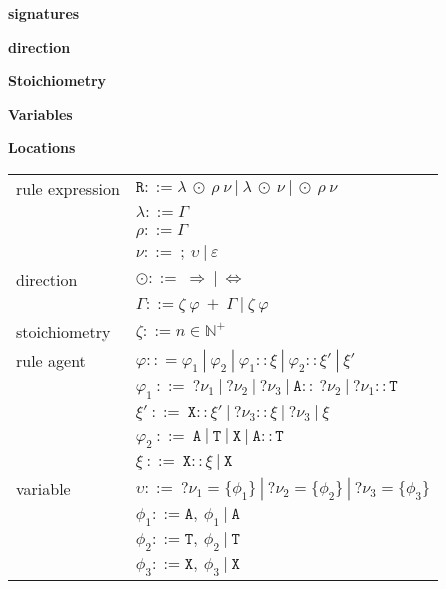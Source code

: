 \documentclass{entcs}
\renewcommand{\~}[0]{\texttildelow}
\begin{document}
\textbf{signatures}

\textbf{direction}

\textbf{Stoichiometry}

\textbf{Variables}

\textbf{Locations}

\begin{center}
{\small
\hspace*{-1cm}\begin{tabular}{ l l }
 rule expression & $\mathtt{R} ::= \lambda ~\odot~ \rho~\nu ~|~ \lambda ~\odot~\nu ~|~ \odot~ \rho~\nu $\\
  & $\lambda ::= \Gamma$\\
  & $\rho ::= \Gamma$\\
  & $\nu ::=~ ;~\upsilon ~|~ \varepsilon$\\
 direction & $\odot ::=~ \Rightarrow~|~\Leftrightarrow $\\
  & $\Gamma ::= \zeta~\varphi~ +~\Gamma ~|~ \zeta~\varphi$\\
 stoichiometry & $\zeta ::= n \in \mathbb{N}^+$\\
 rule agent & $\varphi :: = \varphi_1~|~\varphi_2~|~\varphi_1::\xi~|~\varphi_2::\xi'~|~\xi'$\\
  & $\varphi_1  ~::=~  ?\nu_1~|~?\nu_2~|~?\nu_3~|~\mathtt{A}::~?\nu_2~|~?\nu_1::\mathtt{T}$\\
  & $\xi' ~::=~ \mathtt{X}::\xi'~|~?\nu_3::\xi~|~?\nu_3~|~\xi$\\
  & $\varphi_2  ~::=~  \mathtt{A}~|~\mathtt{T}~|~\mathtt{X}~|~\mathtt{A}::\mathtt{T}$\\
  & $\xi  ~::=~  \mathtt{X}::\xi~|~\mathtt{X}$\\
 variable & $\upsilon ::=~?\nu_1=\{\phi_1\}~|~?\nu_2=\{\phi_2\}~|~?\nu_3=\{\phi_3\}$\\
  & $\phi_1 ::= \mathtt{A},~\phi_1~|~\mathtt{A}$\\
  & $\phi_2 ::= \mathtt{T},~\phi_2~|~\mathtt{T}$\\
  & $\phi_3 ::= \mathtt{X},~\phi_3~|~\mathtt{X}$\\
\end{tabular}
}
\end{center}
\end{document}
